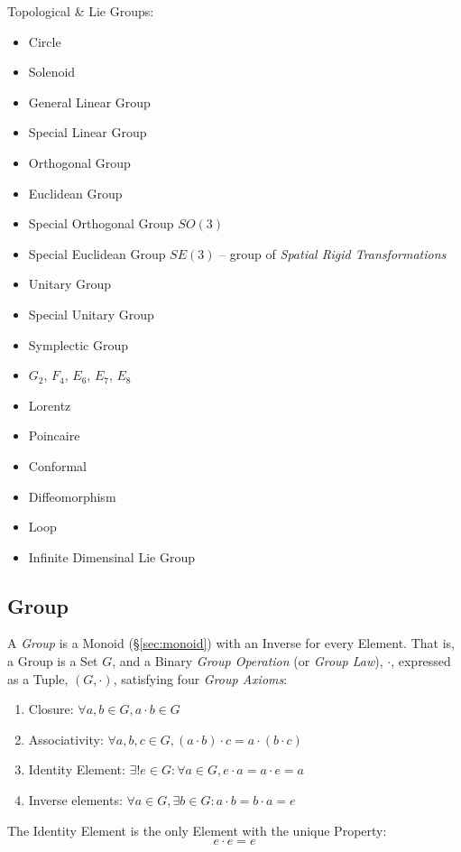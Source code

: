 Topological \& Lie Groups:
\begin{itemize}
  \item Circle
  \item Solenoid
  \item General Linear Group
  \item Special Linear Group
  \item Orthogonal Group
  \item Euclidean Group
  \item Special Orthogonal Group $SO(3)$
  \item Special Euclidean Group $SE(3)$ -- group of \emph{Spatial Rigid
    Transformations}
  \item Unitary Group
  \item Special Unitary Group
  \item Symplectic Group
  \item $G_2$, $F_4$, $E_6$, $E_7$, $E_8$
  \item Lorentz
  \item Poincaire
  \item Conformal
  \item Diffeomorphism
  \item Loop
  \item Infinite Dimensinal Lie Group
\end{itemize}




\subsection{Group}\label{sec:group}

A \emph{Group} is a Monoid (\S\ref{sec:monoid}) with an Inverse for every
Element. That is, a Group is a Set $G$, and a Binary \emph{Group Operation} (or
\emph{Group Law}), $\cdot$, expressed as a Tuple, $(G,\cdot)$, satisfying four
\emph{Group Axioms}:
\begin{enumerate}
  \item Closure: $\forall a,b \in G, a \cdot b \in G$
  \item Associativity: $\forall a,b,c \in G, (a \cdot b) \cdot c = a
    \cdot (b \cdot c)$
  \item Identity Element: $\exists! e \in G : \forall a \in G,
    e \cdot a = a \cdot e = a$
  \item Inverse elements: $\forall a \in G, \exists b \in G :
    a \cdot b = b \cdot a = e$
\end{enumerate}
The Identity Element is the only Element with the unique Property:
\[
  e \cdot e = e
\]


